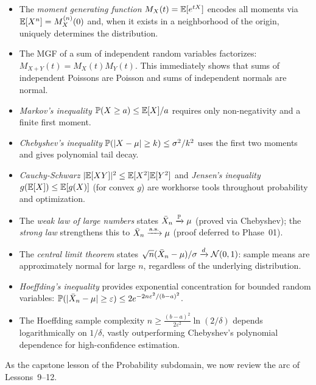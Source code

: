 \documentclass[11pt,a4paper]{article}
\begin{document}
\begin{itemize}
    \item The \emph{moment generating function} $M_X(t) = \mathbb{E}[e^{tX}]$
    encodes all moments via $\mathbb{E}[X^n] = M_X^{(n)}(0)$ and, when it
    exists in a neighborhood of the origin, uniquely determines the
    distribution.
    \item The MGF of a sum of independent random variables factorizes:
    $M_{X+Y}(t) = M_X(t) M_Y(t)$. This immediately shows that sums
    of independent Poissons are Poisson and sums of independent
    normals are normal.
    \item \emph{Markov's inequality}
    $\mathbb{P}(X \geq a) \leq \mathbb{E}[X]/a$ requires only non-negativity and
    a finite first moment.
    \item \emph{Chebyshev's inequality}
    $\mathbb{P}(|X - \mu| \geq k) \leq \sigma^2/k^2$ uses the first
    two moments and gives polynomial tail decay.
    \item \emph{Cauchy-Schwarz}
    $|\mathbb{E}[XY]|^2 \leq \mathbb{E}[X^2]\mathbb{E}[Y^2]$ and \emph{Jensen's inequality}
    $g(\mathbb{E}[X]) \leq \mathbb{E}[g(X)]$ (for convex $g$) are workhorse tools
    throughout probability and optimization.
    \item The \emph{weak law of large numbers} states
    $\bar{X}_n \xrightarrow{\mathbb{P}} \mu$ (proved via Chebyshev); the \emph{strong
    law} strengthens this to $\bar{X}_n \xrightarrow{\text{a.s.}} \mu$ (proof deferred to
    Phase~01).
    \item The \emph{central limit theorem} states
    $\sqrt{n}(\bar{X}_n - \mu)/\sigma \xrightarrow{d} \mathcal{N}(0,1)$:
    sample means are approximately normal for large $n$, regardless
    of the underlying distribution.
    \item \emph{Hoeffding's inequality} provides exponential
    concentration for bounded random variables:
    $\mathbb{P}(|\bar{X}_n - \mu| \geq \varepsilon) \leq
    2e^{-2n\varepsilon^2/(b-a)^2}$.
    \item The Hoeffding sample complexity
    $n \geq \frac{(b-a)^2}{2\varepsilon^2}\ln(2/\delta)$
    depends logarithmically on $1/\delta$, vastly outperforming
    Chebyshev's polynomial dependence for high-confidence estimation.
\end{itemize}

\bigskip

As the capstone lesson of the Probability subdomain, we now review
the arc of Lessons~9--12.
\end{document}
